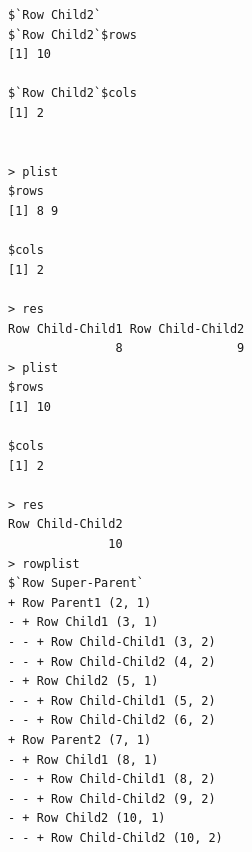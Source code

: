 \documentclass[a4paper]{article}
\begin{document}
\begin{verbatim}
$`Row Child2`
$`Row Child2`$rows
[1] 10

$`Row Child2`$cols
[1] 2


> plist 
$rows
[1] 8 9

$cols
[1] 2

> res 
Row Child-Child1 Row Child-Child2 
               8                9 
> plist 
$rows
[1] 10

$cols
[1] 2

> res 
Row Child-Child2 
              10 
> rowplist 
$`Row Super-Parent`
+ Row Parent1 (2, 1)
- + Row Child1 (3, 1)
- - + Row Child-Child1 (3, 2)
- - + Row Child-Child2 (4, 2)
- + Row Child2 (5, 1)
- - + Row Child-Child1 (5, 2)
- - + Row Child-Child2 (6, 2)
+ Row Parent2 (7, 1)
- + Row Child1 (8, 1)
- - + Row Child-Child1 (8, 2)
- - + Row Child-Child2 (9, 2)
- + Row Child2 (10, 1)
- - + Row Child-Child2 (10, 2)


\end{verbatim}
\end{document}
